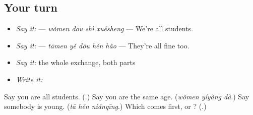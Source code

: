 \subsection*{Your turn}
\begin{itemize}
\raggedright
  \item \emph{Say it:}  — \emph{wǒmen dōu shì xuésheng} — We're all students.
  \item \emph{Say it:}  — \emph{tāmen yě dōu hěn hǎo} — They're all fine too.
  \item \emph{Say it:} the whole exchange, both parts
  \item \emph{Write it:} 
\end{itemize}

\begin{tcolorbox}[breakable,colback=teal!4,colframe=teal!35!black,title={Before you move on}]
Say you are all students. (\textbf{}.) Say you are the same age. (\emph{wǒmen yíyàng dà}.) Say somebody is young. (\emph{tā hěn niánqīng}.) Which comes first,  or ? (\textbf{}.)
\end{tcolorbox}

